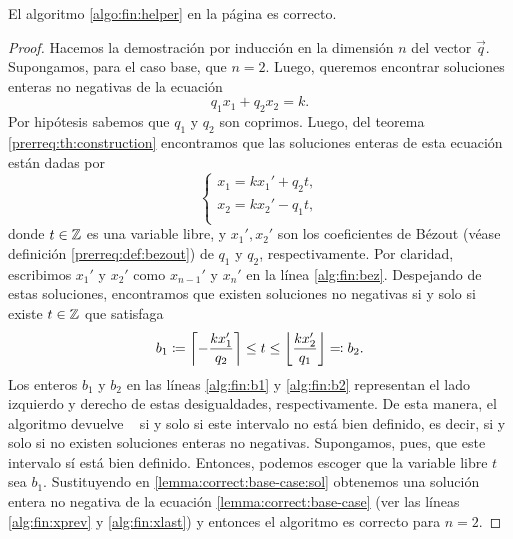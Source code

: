 
\begin{theorem}
	\label{th:fin:helper:correct}
	El algoritmo \ref{algo:fin:helper} en la página \pageref{algo:fin:helper} es correcto.
\end{theorem}
\begin{proof}
	Hacemos la demostración por inducción en la dimensión $n$ del vector $\vec{q}$. Supongamos, para
	el caso base, que $n = 2$. Luego, queremos encontrar soluciones enteras no negativas de la
	ecuación
	\begin{equation}
		\label{lemma:correct:base-case}
		q_1x_1 + q_2x_2 = k.
	\end{equation}
	Por hipótesis sabemos que $q_1$ y $q_2$ son coprimos. Luego, del teorema
	\ref{prerreq:th:construction} encontramos que las soluciones enteras de esta ecuación están
	dadas por
	\begin{equation}
		\label{lemma:correct:base-case:sol}
		\begin{cases}
			x_1 = kx_1' + q_2t, \\
			x_2 = kx_2' - q_1t, \\
		\end{cases}
	\end{equation}
	donde $t \in \mathbb{Z}$ es una variable libre, y $x_1', x_2'$ son los coeficientes de Bézout (véase
	definición \ref{prerreq:def:bezout}) de $q_1$ y $q_2$, respectivamente. Por claridad, escribimos
	$x_1'$ y $x_2'$ como $x_{n-1}'$ y $x_{n}'$ en la línea \ref{alg:fin:bez}. Despejando de estas
	soluciones, encontramos que existen soluciones no negativas si y solo si existe $t \in \mathbb{Z}$ que
	satisfaga
	\begin{equation*}
		b_1 \coloneq \left\lceil -\frac{kx_1'}{q_2} \right\rceil \leq t \leq \left\lfloor \frac{kx_2'}{q_1} \right\rfloor \eqcolon b_2.
	\end{equation*}
	Los enteros $b_1$ y $b_2$ en las líneas \ref{alg:fin:b1} y \ref{alg:fin:b2} representan el
	lado izquierdo y derecho de estas desigualdades, respectivamente. De esta manera, el algoritmo
	devuelve \NIL~ si y solo si este intervalo no está bien definido, es decir, si y solo si no existen
	soluciones enteras no negativas. Supongamos, pues, que este intervalo sí está bien definido.
	Entonces, podemos escoger que la variable libre $t$ sea $b_1$. Sustituyendo en
	\eqref{lemma:correct:base-case:sol} obtenemos una solución entera no negativa de la ecuación
	\eqref{lemma:correct:base-case} (ver las líneas \ref{alg:fin:xprev} y \ref{alg:fin:xlast}) y entonces
	el algoritmo es correcto para $n = 2$.


\end{proof}
